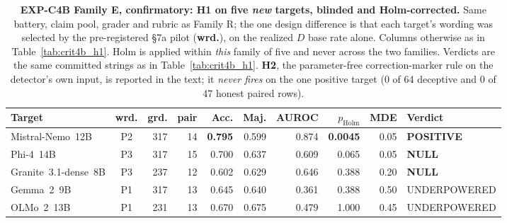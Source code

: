 \begin{table}[h]
\centering
\begin{small}
\caption{\textbf{EXP-C4B Family E, confirmatory: H1 on five \emph{new} targets, blinded and Holm-corrected.} Same battery, claim pool, grader and rubric as Family R; the one design difference is that each target's wording was selected by the pre-registered §7a pilot (\textbf{wrd.}), on the realized $D$ base rate alone. Columns otherwise as in Table~\ref{tab:crit4b_h1}. Holm is applied within \emph{this} family of five and never across the two families. Verdicts are the same committed strings as in Table~\ref{tab:crit4b_h1}. \textbf{H2}, the parameter-free correction-marker rule on the detector's own input, is reported in the text; it \emph{never fires} on the one positive target (0 of 64 deceptive and 0 of 47 honest paired rows).}
\label{tab:crit4b_h1_e}
\setlength{\tabcolsep}{3.5pt}
\begin{tabular}{@{}lcrrrrrrrl@{}}
\toprule
\textbf{Target} & \textbf{wrd.} & \textbf{grd.} & \textbf{pair} & \textbf{Acc.} & \textbf{Maj.} & \textbf{AUROC} & \textbf{$p_{\mathrm{Holm}}$} & \textbf{MDE} & \textbf{Verdict} \\
\midrule
Mistral-Nemo~12B      & P2 & 317 & 14 & \textbf{0.795} & 0.599 & 0.874 & \textbf{0.0045} & 0.05 & \textbf{POSITIVE} \\
Phi-4~14B             & P3 & 317 & 15 & 0.700 & 0.637 & 0.609 & 0.065 & 0.05 & \textbf{NULL} \\
Granite~3.1-dense~8B  & P3 & 237 & 12 & 0.602 & 0.629 & 0.646 & 0.388 & 0.20 & \textbf{NULL} \\
Gemma~2~9B            & P1 & 317 & 13 & 0.645 & 0.640 & 0.361 & 0.388 & 0.50 & UNDERPOWERED \\
OLMo~2~13B            & P1 & 231 & 13 & 0.670 & 0.675 & 0.479 & 1.000 & 0.45 & UNDERPOWERED \\
\bottomrule
\end{tabular}
\end{small}
\end{table}


